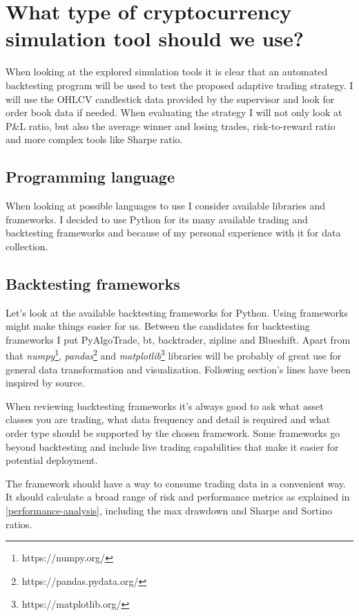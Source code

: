\section{What type of cryptocurrency simulation tool should we use?}
When looking at the explored simulation tools it is clear that an automated backtesting program will be used to test the proposed adaptive trading strategy. I will use the OHLCV candlestick data provided by the supervisor and look for order book data if needed. When evaluating the strategy I will not only look at P\&L ratio, but also the average winner and losing trades, risk-to-reward ratio and more complex tools like Sharpe ratio.

\subsection*{Programming language}
When looking at possible languages to use I consider available libraries and frameworks. I decided to use Python for its many available trading and backtesting frameworks and because of my personal experience with it for data collection.

\subsection*{Backtesting frameworks}
Let's look at the available backtesting frameworks for Python. Using frameworks might make things easier for us. Between the candidates for backtesting frameworks I put PyAlgoTrade, bt, backtrader, zipline and Blueshift. Apart from that \emph{numpy}\footnote{https://numpy.org/}, \emph{pandas}\footnote{https://pandas.pydata.org/} and \emph{matplotlib}\footnote{https://matplotlib.org/} libraries will be probably of great use for general data transformation and visualization. Following section's lines have been inspired by \cite{python-backtesting-frameworks} source.

When reviewing backtesting frameworks it's always good to ask what asset classes you are trading, what data frequency and detail is required and what order type should be supported by the chosen framework. Some frameworks go beyond backtesting and include live trading capabilities that make it easier for potential deployment.

The framework should have a way to consume trading data in a convenient way. It should calculate a broad range of risk and performance metrics as explained in \ref{performance-analysis}, including the max drawdown and Sharpe and Sortino ratios.

